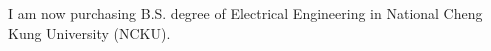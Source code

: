 

\begin{cvparagraph}

    I am now purchasing B.S. degree of Electrical Engineering in National Cheng Kung University (NCKU).
\end{cvparagraph}
